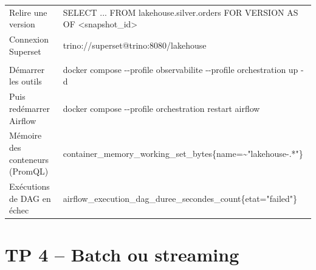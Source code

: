 \begin{center}
\begin{tabularx}{\textwidth}{@{}>{\raggedright\arraybackslash}p{4.1cm} >{\raggedright\arraybackslash\ttfamily\footnotesize}X@{}}
Relire une version & SELECT ... FROM lakehouse.silver.orders FOR VERSION AS OF <snapshot\_id> \\
Connexion Superset & trino://superset@trino:8080/lakehouse \\
\midrule
\multicolumn{2}{@{}l}{\textbf{\textcolor{lhblue}{Supervision}}} \\
Démarrer les outils & docker compose -{}-profile observabilite -{}-profile orchestration up -d \\
Puis redémarrer Airflow & docker compose -{}-profile orchestration restart airflow \\
Mémoire des conteneurs (PromQL) & container\_memory\_working\_set\_bytes\{name=\~{}"lakehouse-.*"\} \\
Exécutions de DAG en échec & airflow\_execution\_dag\_duree\_secondes\_count\{etat="failed"\} \\
\bottomrule
\end{tabularx}
\end{center}

\section{TP 4 -- Batch ou streaming}\label{ann:aide-c6}

